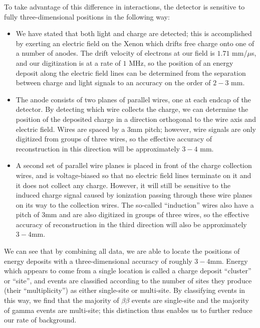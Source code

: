To take advantage of this difference in interactions, the detector is sensitive to fully three-dimensional positions in the following way:
\begin{itemize}
\item We have stated that both light and charge are detected; this is accomplished by exerting an electric field on the Xenon which drifts free charge onto one of a number of anodes.  The drift velocity of electrons at our field is $1.71$ mm/$\mu$s, and our digitization is at a rate of $1$ MHz, so the position of an energy deposit along the electric field lines can be determined from the separation between charge and light signals to an accuracy on the order of $2-3$ mm.
\item The anode consists of two planes of parallel wires, one at each endcap of the detector.  By detecting which wire collects the charge, we can determine the position of the deposited charge in a direction orthogonal to the wire axis and electric field.  Wires are spaced by a $3$mm pitch; however, wire signals are only digitized from groups of three wires, so the effective accuracy of reconstruction in this direction will be approximately $3-4$ mm.
\item A second set of parallel wire planes is placed in front of the charge collection wires, and is voltage-biased so that no electric field lines terminate on it and it does not collect any charge.  However, it will still be sensitive to the induced charge signal caused by ionization passing through these wire planes on its way to the collection wires.  The so-called ``induction'' wires also have a pitch of $3$mm and are also digitized in groups of three wires, so the effective accuracy of reconstruction in the third direction will also be approximately $3-4$mm.
\end{itemize}
We can see that by combining all data, we are able to locate the positions of energy deposits with a three-dimensional accuracy of roughly $3-4$mm.  Energy which appears to come from a single location is called a charge deposit ``cluster'' or ``site'', and events are classified according to the number of sites they produce (their ``multiplicity'') as either single-site or multi-site.  By classifying events in this way, we find that the majority of $\beta\beta$ events are single-site and the majority of gamma events are multi-site; this distinction thus enables us to further reduce our rate of background.




